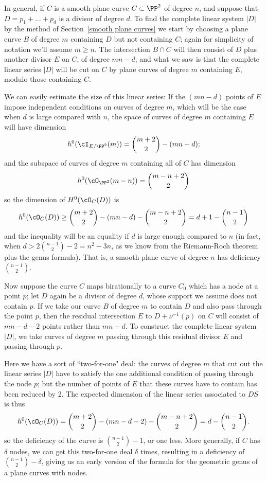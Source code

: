 In general, if $C$ is a smooth plane curve $C \subset \PP^2$ of degree $n$, and suppose that $D = p_1+\dots + p_d$ is a divisor of degree $d$. To find the complete linear system $|D|$ by the method of Section~\ref{smooth plane curves} we start by choosing a plane curve $B$ of degree $m$ containing $D$ but not containing $C$; again for simplicity of notation we'll assume $m \geq n$. The intersection $B \cap C$ will then consist of $D$ plus another divisor $E$ on $C$, of degree $mn-d$; and what we saw is that the complete linear series $|D|$ will be cut on $C$ by plane curves of degree $m$ containing $E$, modulo those containing $C$.

We can easily estimate the size of this linear series: If the $(mn-d)$ points of $E$ impose independent conditions on curves of degree $m$, which will be the case when $d$ is large compared with $n$, the space of curves of degree $m$ containing $E$ will have dimension
$$
h^0(\cI_{E/\PP^2}(m)) = \binom{m+2}{2} - (mn-d);
$$ 
and the subspace of curves of degree $m$ containing all of $C$ has dimension
$$
h^0(\cO_{\PP^2}(m-n)) = \binom{m-n+2}{2}
$$
so the dimension of $H^0(\cO_C(D))$ is
$$
h^0(\cO_C(D)) \geq \binom{m+2}{2} - (mn-d) -  \binom{m-n+2}{2} = d + 1 - \binom{n-1}{2}
$$
and the inequality will be an equality if $d$ is large enough compared to $n$ (in fact,  when $d> 2\binom{n-1}{2}-2 = n^2-3n$,
as we know from the Riemann-Roch theorem plus the genus formula).  That is, a smooth plane curve of degree $n$ has deficiency $\binom{n-1}{2}$.

Now suppose the curve $C$ maps birationally to a curve $C_0$ which has a node at a point $p$; let $D$ again be a divisor of degree $d$, whose support we assume does not contain $p$. If we take our curve $B$ of degree $m$ to contain $D$ and also pass through the point $p$, then the residual intersection $E$ to $D+\nu^{-1}(p)$ on $C$ will consist of $mn-d-2$ points rather than $mn-d$. To construct the complete linear system $|D|$, we take curves of degree $m$ passing through this residual divisor $E$ and passing through $p$.

Here we have a sort of ``two-for-one" deal: the curves of degree $m$ that cut out the linear series $|D|$ have to satisfy the one additional condition of passing through the node $p$; but the number of points of $E$ that these curves have to contain has been reduced by 2. The expected dimension of the linear series associated to $DS$ is thus
$$
h^0(\cO_C(D)) = \binom{m+2}{2} - (mn-d-2) -  \binom{m-n+2}{2} = d  - \binom{n-1}{2}.
$$
so the deficiency of the curve is $\binom{n-1}{2}-1$, or one less. More generally, if $C$ has $\delta$ nodes, we can get this two-for-one deal $\delta$ times, resulting in a deficiency of $\binom{n-1}{2} - \delta$, giving us an early version of the formula for the  geometric genus of a plane curves with nodes.

